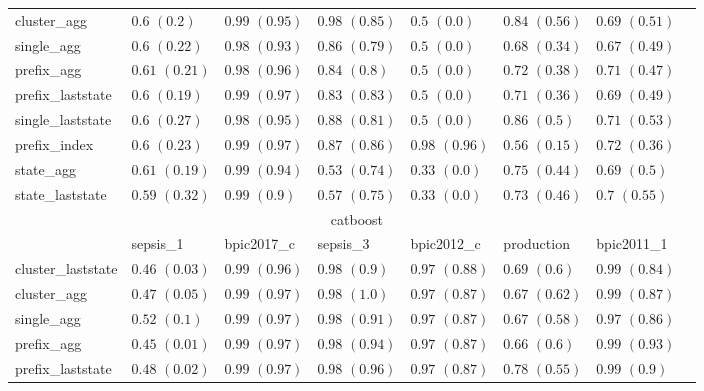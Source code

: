 \begin{table}[!htbp]
{\begin{tabular}{llllllll}
			cluster\_agg & $0.6$ ${(0.2)}$ & $0.99$ ${(0.95)}$ & $0.98$ ${(0.85)}$ & $0.5$ ${(0.0)}$ & $0.84$ ${(0.56)}$ & $0.69$ ${(0.51)}$ \\
			single\_agg & $0.6$ ${(0.22)}$ & $0.98$ ${(0.93)}$ & $0.86$ ${(0.79)}$ & $0.5$ ${(0.0)}$ & $0.68$ ${(0.34)}$ & $0.67$ ${(0.49)}$ \\
			prefix\_agg & $0.61$ ${(0.21)}$ & $0.98$ ${(0.96)}$ & $0.84$ ${(0.8)}$ & $0.5$ ${(0.0)}$ & $0.72$ ${(0.38)}$ & $0.71$ ${(0.47)}$ \\
			prefix\_laststate & $0.6$ ${(0.19)}$ & $0.99$ ${(0.97)}$ & $0.83$ ${(0.83)}$ & $0.5$ ${(0.0)}$ & $0.71$ ${(0.36)}$ & $0.69$ ${(0.49)}$ \\
			single\_laststate & $0.6$ ${(0.27)}$ & $0.98$ ${(0.95)}$ & $0.88$ ${(0.81)}$ & $0.5$ ${(0.0)}$ & $0.86$ ${(0.5)}$ & $0.71$ ${(0.53)}$ \\
			prefix\_index & $0.6$ ${(0.23)}$ & $0.99$ ${(0.97)}$ & $0.87$ ${(0.86)}$ & $\mathbf{0.98}$ $\mathbf{(0.96)}$  & $0.56$ ${(0.15)}$ & $\mathbf{0.72}$ $\mathbf{(0.36)}$  \\
			state\_agg & $0.61$ ${(0.19)}$ & $0.99$ ${(0.94)}$ & $0.53$ ${(0.74)}$ & $0.33$ ${(0.0)}$ & $0.75$ ${(0.44)}$ & $0.69$ ${(0.5)}$ \\
			state\_laststate & $0.59$ ${(0.32)}$ & $0.99$ ${(0.9)}$ & $0.57$ ${(0.75)}$ & $0.33$ ${(0.0)}$ & $0.73$ ${(0.46)}$ & $0.7$ ${(0.55)}$ \\
			\bottomrule
			\toprule
			& \multicolumn{5}{c}{catboost}
			\\
			& sepsis\_1 & bpic2017\_c & sepsis\_3 & bpic2012\_c & production & bpic2011\_1
			\\ \midrule
			cluster\_laststate & $0.46$ ${(0.03)}$ & $\mathbf{0.99}$ $\mathbf{(0.96)}$  & $\mathbf{0.98}$ $\mathbf{(0.9)}$  & $0.97$ ${(0.88)}$ & $0.69$ ${(0.6)}$ & $0.99$ ${(0.84)}$ \\
			cluster\_agg & $0.47$ ${(0.05)}$ & $\mathbf{0.99}$ $\mathbf{(0.97)}$  & $\mathbf{0.98}$ $\mathbf{(1.0)}$  & $0.97$ ${(0.87)}$ & $0.67$ ${(0.62)}$ & $0.99$ ${(0.87)}$ \\
			single\_agg & $0.52$ ${(0.1)}$ & $\mathbf{0.99}$ $\mathbf{(0.97)}$  & $\mathbf{0.98}$ $\mathbf{(0.91)}$  & $0.97$ ${(0.87)}$ & $0.67$ ${(0.58)}$ & $0.97$ ${(0.86)}$ \\
			prefix\_agg & $0.45$ ${(0.01)}$ & $\mathbf{0.99}$ $\mathbf{(0.97)}$  & $\mathbf{0.98}$ $\mathbf{(0.94)}$  & $0.97$ ${(0.87)}$ & $0.66$ ${(0.6)}$ & $0.99$ ${(0.93)}$ \\
			prefix\_laststate & $0.48$ ${(0.02)}$ & $\mathbf{0.99}$ $\mathbf{(0.97)}$  & $\mathbf{0.98}$ $\mathbf{(0.96)}$  & $0.97$ ${(0.87)}$ & $\mathbf{0.78}$ $\mathbf{(0.55)}$  & $0.99$ ${(0.9)}$ \\

\end{tabular}}
\end{table}
